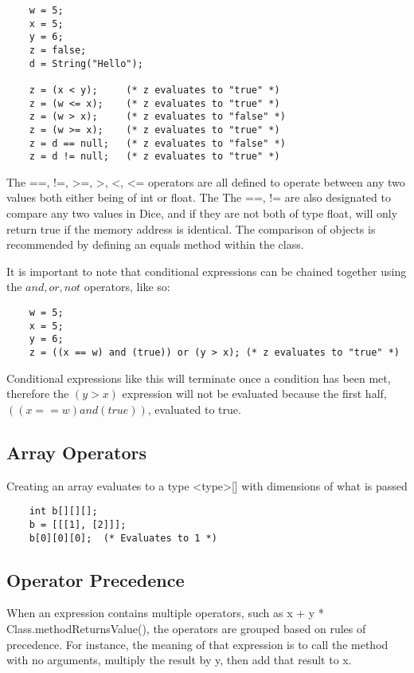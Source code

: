 \begin{homeworkProblem}
\begin{verbatim}
	w = 5;
	x = 5;
	y = 6;
	z = false;
	d = String("Hello");
	
	z = (x < y);     (* z evaluates to "true" *)
	z = (w <= x);    (* z evaluates to "true" *)
	z = (w > x);     (* z evaluates to "false" *)
	z = (w >= x);    (* z evaluates to "true" *)
	z = d == null;   (* z evaluates to "false" *)
	z = d != null;   (* z evaluates to "true" *)
	\end{verbatim}
	
	The ==, !=, \textgreater=, \textgreater, \textless, \textless= operators are all defined to operate between any two values both either being of int or float. The The ==, != are also designated to compare any two values in Dice, and if they are not both of type float, will only return true if the memory address is identical. The comparison of objects is recommended by defining an equals method within the class. 
	
	It is important to note that conditional expressions can be chained together using the $and, or, not$ operators, like so:
	\begin{verbatim}
	w = 5;
	x = 5;
	y = 6;
	z = ((x == w) and (true)) or (y > x); (* z evaluates to "true" *)
	\end{verbatim}
	
	Conditional expressions like this will terminate once a condition has been met, therefore the $(y>x)$ expression will not be evaluated because the first half, $((x == w) and (true))$, evaluated to true.
	
	\subsection{Array Operators}
	Creating an array evaluates to a type \textless type\textgreater[] with dimensions of what is passed
	\begin{verbatim}
	int b[][][];
	b = [[[1], [2]]];
	b[0][0][0];  (* Evaluates to 1 *)
	\end{verbatim}
	
	\subsection{Operator Precedence}
	
	When an expression contains multiple operators, such as x + y * Class.methodReturnsValue(), the operators are grouped based on rules of precedence. For instance, the meaning of that expression is to call the method with no arguments, multiply the result by y, then add that result to x. 
	

\end{homeworkProblem}
